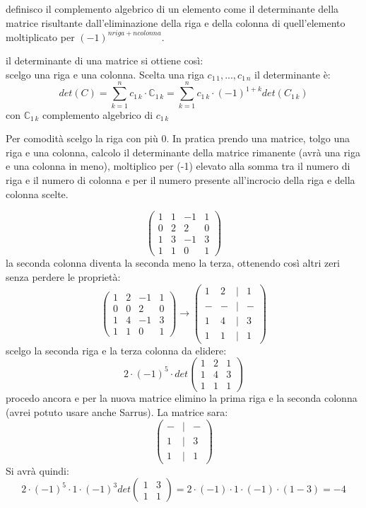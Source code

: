 \documentclass[a4paper,12pt, oneside]{book}
\begin{document}
definisco il complemento algebrico di un elemento come il determinante della matrice risultante dall'eliminazione della riga e della colonna di quell'elemento moltiplicato per $(-1)^{nriga+ ncolonna}$.
\begin{teorema}[di Laplace]
il determinante di una matrice si ottiene così:\\
scelgo una riga e una colonna. Scelta una riga $c_{1\,1},...,c_{1\,n}$ il determinante è:
$$det(C)=\sum_{k=1}^n c_{1\,k}\cdot \mathbb{C}_{1\,k}=\sum_{k=1}^n c_{1\,k}\cdot (-1)^{1+k} det(C_{1\,k})$$
con $\mathbb{C}_{1\,k}$ complemento algebrico di $c_{1\,k}$
\end{teorema}
Per comodità scelgo la riga con più 0. In pratica prendo una matrice, tolgo una riga e una colonna, calcolo il determinante della matrice rimanente (avrà una riga e una colonna in meno), moltiplico per (-1) elevato alla somma tra il numero di riga e il numero di colonna e per il numero presente all'incrocio della riga e della colonna scelte.
\begin{esempio}
$$\left(\begin{matrix}
1 & 1 & -1 & 1\\
0 & 2 & 2 & 0\\
1 & 3 & -1 & 3\\
1 & 1 & 0 & 1
\end{matrix}\right)$$
la seconda colonna diventa la seconda meno la terza, ottenendo così altri zeri senza perdere le proprietà:
$$\left(\begin{matrix}
1 & 2 & -1 & 1\\
0 & 0 & 2 & 0\\
1 & 4 & -1 & 3\\
1 & 1 & 0 & 1
\end{matrix}\right) \rightarrow
\left(\begin{matrix}
1 & 2 & | & 1\\
- & - & | & -\\
1 & 4 & | & 3\\
1 & 1 & |& 1
\end{matrix}\right)$$
scelgo la seconda riga e la terza colonna da elidere:
$$2\cdot (-1)^5\cdot det\left(\begin{matrix}
1 & 2  & 1\\
1 & 4  & 3\\
1 & 1 & 1
\end{matrix}\right)
$$
procedo ancora e per la nuova matrice elimino la prima riga  e la seconda colonna (avrei potuto usare anche Sarrus). La matrice sara:
$$
\left(\begin{matrix}
- & |  & -\\
1 & |  & 3\\
1 & | & 1
\end{matrix}\right)
$$
Si  avrà quindi:
$$2\cdot (-1)^5\cdot 1\cdot (-1)^3 det\left(\begin{matrix}
1 & 3\\
1 & 1
\end{matrix}\right)=2\cdot (-1)\cdot 1\cdot (-1)\cdot (1-3)=-4
$$
\end{esempio}
\end{document}
